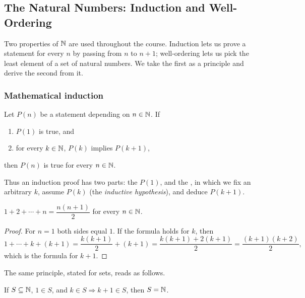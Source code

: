 \subsection{The Natural Numbers: Induction and Well-Ordering}

Two properties of $\mathbb{N}$ are used throughout the course. Induction lets us
prove a statement for every $n$ by passing from $n$ to $n+1$; well-ordering
lets us pick the least element of a set of natural numbers. We take the first
as a principle and derive the second from it.

\subsubsection{Mathematical induction}
\begin{axiom}
    Let $P(n)$ be a statement depending on $n\in\mathbb{N}$. If
    \begin{enumerate}[label=(\arabic*)]
        \item $P(1)$ is true, and
        \item for every $k\in\mathbb{N}$, $P(k)$ implies $P(k+1)$,
    \end{enumerate}
    then $P(n)$ is true for every $n\in\mathbb{N}$.
\end{axiom}

Thus an induction proof has two parts: the  $P(1)$, and the
, in which we fix an arbitrary $k$, assume $P(k)$ (the
\emph{inductive hypothesis}), and deduce $P(k+1)$.

\begin{example}
    $1+2+\cdots+n=\dfrac{n(n+1)}{2}$ for every $n\in\mathbb{N}$.
\end{example}

\begin{proof}
    For $n=1$ both sides equal $1$. If the formula holds for $k$, then
    \begin{equation*}
        1+\cdots+k+(k+1)
        = \frac{k(k+1)}{2}+(k+1)
        = \frac{k(k+1)+2(k+1)}{2}
        = \frac{(k+1)(k+2)}{2},
    \end{equation*}
    which is the formula for $k+1$.
\end{proof}

The same principle, stated for sets, reads as follows.

\begin{proposition}\label{prop:induction-sets}
    If $S\subseteq\mathbb{N}$, $1\in S$, and $k\in S\Rightarrow k+1\in S$, then
    $S=\mathbb{N}$.
\end{proposition}

